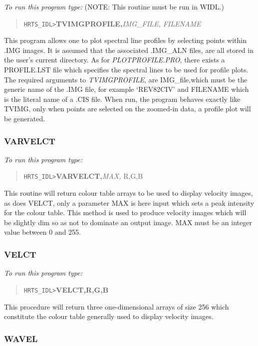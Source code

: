 {\em To run this program type:} (NOTE: This routine must be run in WIDL.)
\begin{quote}
{\tt HRTS\_IDL>}{\bf TVIMGPROFILE,}{\it IMG\_FILE, FILENAME}              
\end{quote}
      This program allows one to plot spectral line profiles by selecting
   points within .IMG images.  It is assumed that the  associated .IMG\_ALN
   files, are all stored in the user's current directory.
   As for {\em PLOTPROFILE.PRO}, there exists a PROFILE.LST file which specifies
   the spectral lines to be used for profile plots.  The  required
   arguments to {\em TVIMGPROFILE}, are IMG\_file,which must be the generic name 
of the .IMG
   file, for example `REV82CIV' and FILENAME which is the literal name of a
   .CIS file.  When run, the program behaves exactly
   like TVIMG, only when points are selected on the zoomed-in data, a
   profile plot will be generated.

\subsubsection{VARVELCT}

{\em To run this program type:}
\begin{quote}
{\tt HRTS\_IDL>}{\bf VARVELCT,}{\it MAX,} R,G,B                
\end{quote}   
      This routine will return colour table arrays to be used to display
   velocity images, as does VELCT, only a parameter MAX is here input
   which sets a peak intensity for the colour table.  This method is used
   to produce velocity images which will be slightly dim so as not to
   dominate an output image.  MAX must be an integer value between 0 and
   255.

\subsubsection{VELCT}   

{\em To run this program type:}
\begin{quote}
{\tt HRTS\_IDL>}{\bf VELCT,R,G,B}                   
\end{quote}   
      This procedure will return three one-dimensional arrays of size 256
   which constitute the colour table generally used to display velocity
   images.

\subsubsection{WAVEL}

